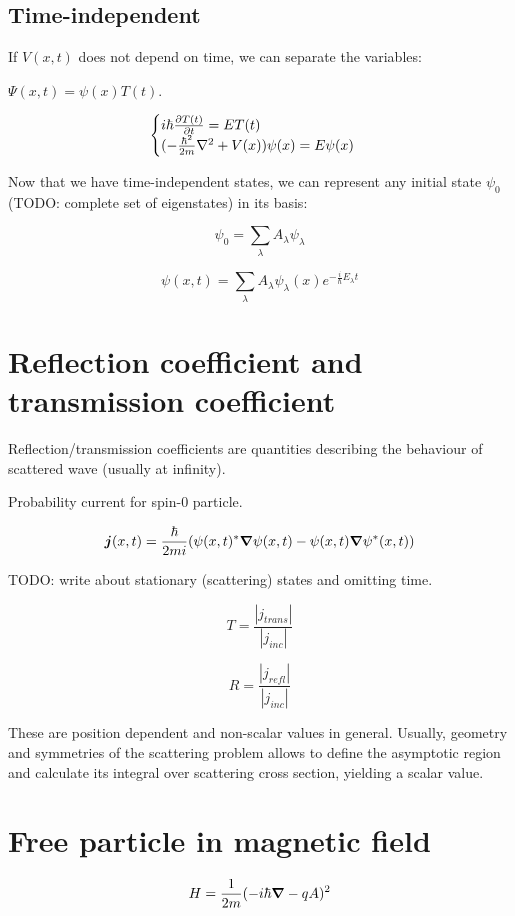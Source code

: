 \documentclass[12pt, a4paper]{article}
\begin{document}
\subsection{Time-independent}

If $V(x, t)$ does not depend on time, we can separate the variables:

$\Psi(x, t) = \psi(x) T(t)$.

$$\begin{cases}
i \hbar \pdv{T(t)}{t} = E T(t) \\
(- \frac{\hbar^2}{2 m} \laplacian + V(x)) \psi(x) = E \psi(x)
\end{cases}$$

Now that we have time-independent states, we can represent any initial state $\psi_0$ (TODO: complete set of eigenstates) in its basis:

$$\psi_0 = \sum\limits_\lambda A_\lambda \psi_\lambda$$

$$\psi(x, t) = \sum\limits_\lambda A_\lambda \psi_\lambda(x) e^{- \frac{i}{\hbar} E_\lambda t}$$

\section{Reflection coefficient and transmission coefficient}
Reflection/transmission coefficients are quantities describing the behaviour of scattered wave (usually at infinity).

Probability current for spin-0 particle.


$$\bm{j}(x, t) = \frac{\hbar}{2 m i} (\psi(x, t)^* \grad \psi(x, t) - \psi(x, t) \grad \psi^*(x, t))$$

TODO: write about stationary (scattering) states and omitting time.

$$T = \frac{|j_{trans}|}{|j_{inc}|}$$

$$R = \frac{|j_{refl}|}{|j_{inc}|}$$

These are position dependent and non-scalar values in general. Usually, geometry and symmetries of the scattering problem allows to define the asymptotic region and calculate its integral over scattering cross section, yielding a scalar value.

\section{Free particle in magnetic field}
$$H = \frac{1}{2m} (- i \hbar \grad - q A)^2$$
\end{document}
